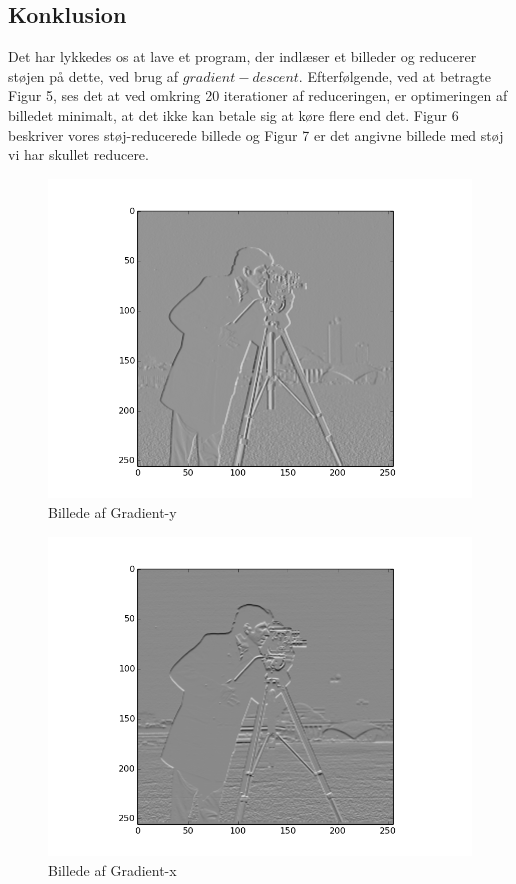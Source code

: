 \documentclass[12pt, a4paper]{article}
\begin{document}
\subsection*{Konklusion}
Det har lykkedes os at lave et program, der indlæser et billeder og reducerer støjen på dette, ved brug af $gradient-descent$. Efterfølgende, ved at betragte Figur 5, ses det at ved omkring 20 iterationer af reduceringen, er optimeringen af billedet minimalt, at det ikke kan betale sig at køre flere end det. Figur 6 beskriver vores støj-reducerede billede og Figur 7 er det angivne billede med støj vi har skullet reducere.

\begin{figure}[H]
  \caption{Billede af Gradient-y}
  \centering
	\includegraphics[scale=0.8]{grady}
\end{figure}
\begin{figure}[H]
  \caption{Billede af Gradient-x}
  \centering
	\includegraphics[scale=0.8]{gradx}
\end{figure}
\end{document}
